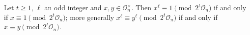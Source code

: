 Let $t\ge1$, $\ell$ an odd integer and $x,y\in\mathcal O_n^\times$. Then $x^\ell\equiv1\pmod{2^t\mathcal O_n}$ if and only if $x\equiv1\pmod{2^t\mathcal O_n}$; more generally $x^\ell\equiv y^\ell\pmod{2^t\mathcal O_n}$ if and only if $x\equiv y\pmod{2^t\mathcal O_n}$.
